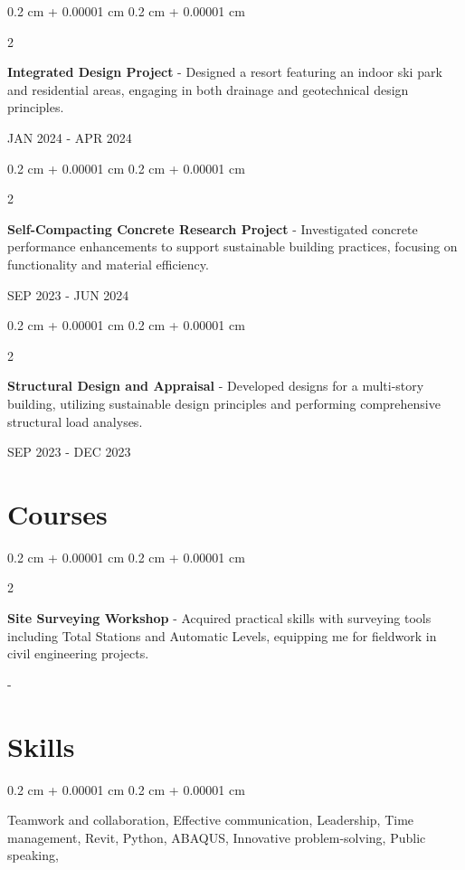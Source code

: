 \documentclass[10pt, letterpaper]{article}
\newenvironment{onecolentry}{
\begin{adjustwidth}{
0.2 cm + 0.00001 cm
}{
0.2 cm + 0.00001 cm
}
}{
\end{adjustwidth}
} %
\newenvironment{twocolentry}[2][]{
\onecolentry
\def\secondColumn{#2}
\setcolumnwidth{\fill, 4.5 cm}
\begin{paracol}{2}
}{
\switchcolumn \raggedleft \secondColumn
\end{paracol}
\endonecolentry
} %
\begin{document}
\begin{twocolentry}{JAN 2024 - APR 2024}
\textbf{Integrated Design Project} - \textit{}  
\newline 
\newline Designed a resort featuring an indoor ski park and residential areas, engaging in both drainage and geotechnical design principles.

\end{twocolentry}
                  

\begin{twocolentry}{SEP 2023 - JUN 2024}
\textbf{Self-Compacting Concrete Research Project} - \textit{}  
\newline 
\newline Investigated concrete performance enhancements to support sustainable building practices, focusing on functionality and material efficiency.

\end{twocolentry}
                  

\begin{twocolentry}{SEP 2023 - DEC 2023}
\textbf{Structural Design and Appraisal} - \textit{}  
\newline 
\newline Developed designs for a multi-story building, utilizing sustainable design principles and performing comprehensive structural load analyses.

\end{twocolentry}
\medskip

\section{Courses}

\begin{twocolentry}{ - }
\textbf{Site Surveying Workshop} - \textit{}  
\newline 
\newline Acquired practical skills with surveying tools including Total Stations and Automatic Levels, equipping me for fieldwork in civil engineering projects.

\end{twocolentry}
\medskip

\section{Skills}
\begin{onecolentry}

{Teamwork and collaboration}, 
{Effective communication}, 
{Leadership}, 
{Time management}, 
{Revit}, 
{Python}, 
{ABAQUS}, 
{Innovative problem-solving}, 
{Public speaking}, 
\end{onecolentry}
\end{document}

